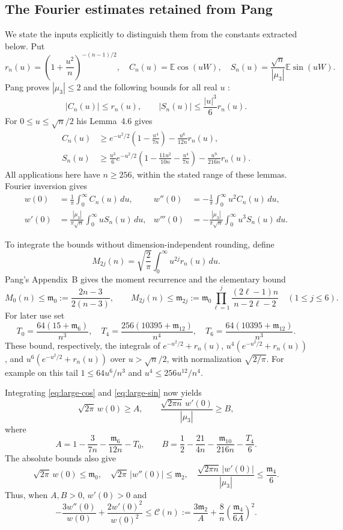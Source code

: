 \documentclass[11pt,a4paper]{article}
\theoremstyle{remark}\newtheorem{remark}[theorem]{Remark}
\newcommand{\E}{\mathbb E}
\begin{document}
\subsection{The Fourier estimates retained from Pang}
We state the inputs explicitly to distinguish them from the constants
extracted below. Put
\[
 r_n(u)=\left(1+\frac{u^2}{n}\right)^{-(n-1)/2},\quad
 C_n(u)=\E\cos(uW),\quad
 S_n(u)=\frac{\sqrt n}{|\mu_3|}\E\sin(uW).
\]
Pang proves $|\mu_3|\le2$ and the following bounds for all real $u$
\cite[Lemma~4.1, Corollary~4.4, (45)--(46)]{Pang}:
\[
 |C_n(u)|\le r_n(u),\qquad |S_n(u)|\le\frac{|u|^3}{6}r_n(u).
\]
For $0\le u\le\sqrt n/2$ his Lemma~4.6 gives
\begin{align}
 C_n(u)&\ge e^{-u^2/2}\left(1-\frac{u^4}{7n}\right)
                   -\frac{u^6}{12n}r_n(u),\label{eq:large-cos}\\
 S_n(u)&\ge\frac{u^3}{6}e^{-u^2/2}
       \left(1-\frac{11u^2}{10n}-\frac{u^4}{7n}\right)
                   -\frac{u^9}{216n}r_n(u).\label{eq:large-sin}
\end{align}
All applications here have $n\ge256$, within the stated range of these
lemmas. Fourier inversion gives
\begin{align*}
 w(0)&=\frac1\pi\int_0^\infty C_n(u)\,du,&
 w''(0)&=-\frac1\pi\int_0^\infty u^2C_n(u)\,du,\\
 w'(0)&=\frac{|\mu_3|}{\pi\sqrt n}\int_0^\infty uS_n(u)\,du,&
 w'''(0)&=-\frac{|\mu_3|}{\pi\sqrt n}\int_0^\infty u^3S_n(u)\,du.
\end{align*}

To integrate the bounds without dimension-independent rounding, define
\[
 M_{2j}(n)=\sqrt{\frac2\pi}\int_0^\infty u^{2j}r_n(u)\,du.
\]
Pang's Appendix~B gives the moment recurrence and the elementary bound
\[
 M_0(n)\le\mathfrak m_0:=\frac{2n-3}{2(n-3)},\qquad
 M_{2j}(n)\le\mathfrak m_{2j}:=
 \mathfrak m_0\prod_{\ell=1}^j\frac{(2\ell-1)n}{n-2\ell-2}
 \quad(1\le j\le6).
\]
For later use set
\[
 T_0=\frac{64(15+\mathfrak m_6)}{n^3},\quad
 T_4=\frac{256(10395+\mathfrak m_{12})}{n^4},\quad
 T_6=\frac{64(10395+\mathfrak m_{12})}{n^3}.
\]
These bound, respectively, the integrals of
$e^{-u^2/2}+r_n(u)$, $u^4(e^{-u^2/2}+r_n(u))$, and
$u^6(e^{-u^2/2}+r_n(u))$ over $u>\sqrt n/2$, with normalization
$\sqrt{2/\pi}$. For example on this tail $1\le64u^6/n^3$ and
$u^4\le256u^{12}/n^4$.

Integrating \eqref{eq:large-cos} and \eqref{eq:large-sin} now yields
\[
 \sqrt{2\pi}\,w(0)\ge A,
 \qquad \frac{\sqrt{2\pi n}\,w'(0)}{|\mu_3|}\ge B,
\]
where
\[
 A=1-\frac3{7n}-\frac{\mathfrak m_6}{12n}-T_0,
 \qquad
 B=\frac12-\frac{21}{4n}-\frac{\mathfrak m_{10}}{216n}-\frac{T_4}{6}.
\]
The absolute bounds also give
\[
 \sqrt{2\pi}\,w(0)\le\mathfrak m_0,\quad
 \sqrt{2\pi}\,|w''(0)|\le\mathfrak m_2,\quad
 \frac{\sqrt{2\pi n}\,|w'(0)|}{|\mu_3|}\le\frac{\mathfrak m_4}{6}.
\]
Thus, when $A,B>0$, $w'(0)>0$ and
\[
 -\frac{3w''(0)}{w(0)}+\frac{2w'(0)^2}{w(0)^2}
 \le\mathcal C(n):=
 \frac{3\mathfrak m_2}{A}+\frac8n\left(\frac{\mathfrak m_4}{6A}\right)^2.
\]
\end{document}
